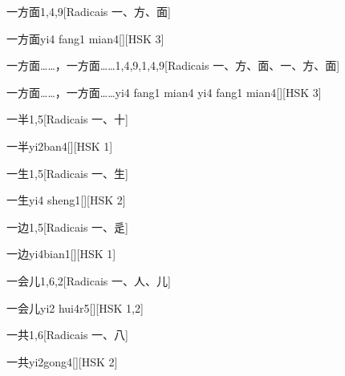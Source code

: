 \begin{entry}{一方面}{1,4,9}[Radicais ⼀、⽅、⾯]
  \begin{phonetics}{一方面}{yi4 fang1 mian4}[][HSK 3]
  \end{phonetics}
\end{entry}

\begin{entry}{一方面……，一方面……}{1,4,9,1,4,9}[Radicais ⼀、⽅、⾯、⼀、⽅、⾯]
  \begin{phonetics}{一方面……，一方面……}{yi4 fang1 mian4 yi4 fang1 mian4}[][HSK 3]
  \end{phonetics}
\end{entry}

\begin{entry}{一半}{1,5}[Radicais ⼀、⼗]
  \begin{phonetics}{一半}{yi2ban4}[][HSK 1]
  \end{phonetics}
\end{entry}

\begin{entry}{一生}{1,5}[Radicais ⼀、⽣]
  \begin{phonetics}{一生}{yi4 sheng1}[][HSK 2]
  \end{phonetics}
\end{entry}

\begin{entry}{一边}{1,5}[Radicais ⼀、⾡]
  \begin{phonetics}{一边}{yi4bian1}[][HSK 1]
  \end{phonetics}
\end{entry}

\begin{entry}{一会儿}{1,6,2}[Radicais ⼀、⼈、⼉]
  \begin{phonetics}{一会儿}{yi2 hui4r5}[][HSK 1,2]
  \end{phonetics}
\end{entry}

\begin{entry}{一共}{1,6}[Radicais ⼀、⼋]
  \begin{phonetics}{一共}{yi2gong4}[][HSK 2]
  \end{phonetics}
\end{entry}

